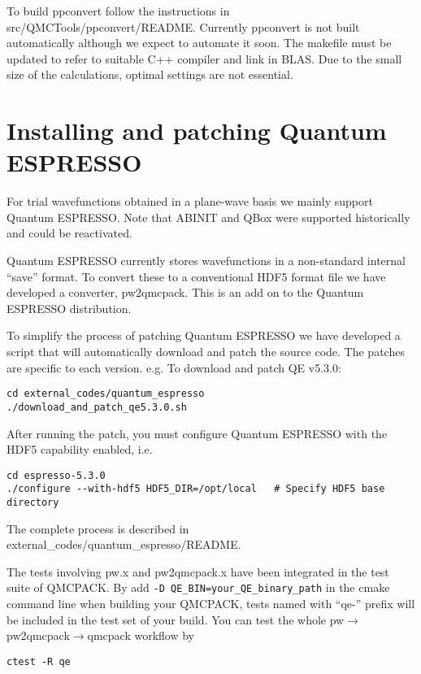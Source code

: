 To build ppconvert follow the instructions in
src/QMCTools/ppconvert/README. Currently ppconvert is not built
automatically although we expect to automate it soon. The makefile
must be updated to refer to suitable C++ compiler and link in
BLAS. Due to the small size of the calculations, optimal settings are
not essential.

\section{Installing and patching Quantum ESPRESSO}
\label{sec:buildqe}
For trial wavefunctions obtained in a plane-wave basis we mainly
support Quantum ESPRESSO. Note that ABINIT and QBox were supported historically
and could be reactivated.

Quantum ESPRESSO currently stores wavefunctions in a non-standard internal
``save'' format. To convert these to a conventional HDF5 format file
we have developed a converter, pw2qmcpack. This is an add on to the
Quantum ESPRESSO distribution.

To simplify the process of patching Quantum ESPRESSO we have developed
a script that will automatically download and patch the source
code. The patches are specific to each version. e.g. To download and
patch QE v5.3.0:
\begin{verbatim}
cd external_codes/quantum_espresso
./download_and_patch_qe5.3.0.sh
\end{verbatim}
After running the patch, you must configure Quantum ESPRESSO with
the HDF5 capability enabled, i.e.
\begin{verbatim}
cd espresso-5.3.0
./configure --with-hdf5 HDF5_DIR=/opt/local   # Specify HDF5 base directory
\end{verbatim}

The complete process is described in external\_codes/quantum\_espresso/README.

The tests involving pw.x and pw2qmcpack.x have been integrated in the test suite of QMCPACK.
By add \texttt{-D QE\_BIN=your\_QE\_binary\_path} in the cmake command line when building your QMCPACK,
tests named with ``qe-'' prefix will be included in the test set of your build.
You can test the whole pw$\to$pw2qmcpack$\to$qmcpack workflow by
\begin{verbatim}
ctest -R qe
\end{verbatim}


